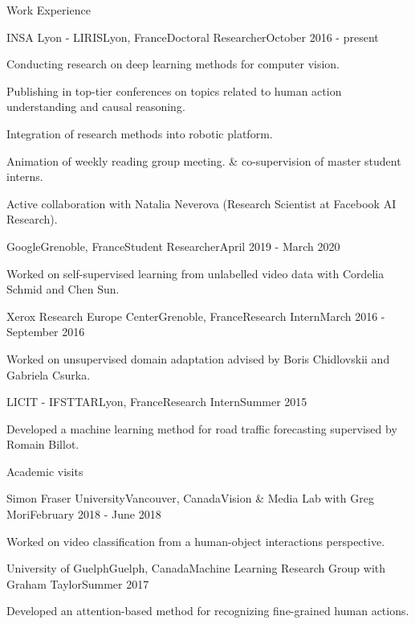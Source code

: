 \documentclass{resume} %
\begin{document}
\begin{rSection}{Work Experience}
     \begin{rSubsection}{INSA Lyon - LIRIS}{Lyon, France}{Doctoral Researcher}{October 2016 - present}
                \item Conducting research on deep learning methods for computer vision.
                \item Publishing in top-tier conferences on topics related to human action understanding and causal reasoning.
                \item Integration of research methods into robotic platform.
                \item Animation of weekly reading group meeting. \& co-supervision of master student interns.
                \item Active collaboration with Natalia Neverova (Research Scientist at Facebook AI Research).
     \end{rSubsection}
     \begin{rSubsection}{Google}{Grenoble, France}{Student Researcher}{April 2019 - March 2020}
            \item Worked on self-supervised learning from unlabelled video data with Cordelia Schmid and Chen Sun.
    \end{rSubsection}
    \begin{rSubsection}{Xerox Research Europe Center}{Grenoble, France}{Research Intern}{March 2016 - September 2016}
            \item Worked on unsupervised domain adaptation advised by Boris Chidlovskii and Gabriela Csurka.
    \end{rSubsection}
    \begin{rSubsection}{LICIT - IFSTTAR}{Lyon, France}{Research Intern}{Summer 2015}
            \item Developed a machine learning method for road traffic forecasting supervised by Romain Billot.
    \end{rSubsection}
\end{rSection}

\begin{rSection}{Academic visits}
     \begin{rSubsection}{Simon Fraser University}{Vancouver, Canada}{Vision \& Media Lab with Greg Mori}{February 2018 - June 2018}
            \item Worked on video classification from a human-object interactions perspective.
    \end{rSubsection}
     \begin{rSubsection}{University of Guelph}{Guelph, Canada}{Machine Learning Research Group with Graham Taylor}{Summer 2017}
            \item Developed an attention-based method for recognizing fine-grained human actions.
    \end{rSubsection}
\end{rSection}
\end{document}
